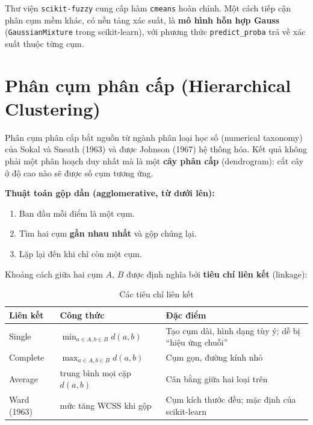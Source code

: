 Thư viện \texttt{scikit-fuzzy} cung cấp hàm \texttt{cmeans} hoàn chỉnh. Một cách tiếp cận phân cụm mềm khác, có nền tảng xác suất, là \textbf{mô hình hỗn hợp Gauss} (\texttt{GaussianMixture} trong scikit-learn), với phương thức \texttt{predict\_proba} trả về xác suất thuộc từng cụm.

\section{Phân cụm phân cấp (Hierarchical Clustering)}

Phân cụm phân cấp bắt nguồn từ ngành phân loại học số (numerical taxonomy) của Sokal và Sneath (1963) và được Johnson (1967) hệ thống hóa. Kết quả không phải một phân hoạch duy nhất mà là một \textbf{cây phân cấp} (dendrogram): cắt cây ở độ cao nào sẽ được số cụm tương ứng.

\noindent\textbf{Thuật toán gộp dần (agglomerative, từ dưới lên):}
\begin{enumerate}
    \item Ban đầu mỗi điểm là một cụm.
    \item Tìm hai cụm \textbf{gần nhau nhất} và gộp chúng lại.
    \item Lặp lại đến khi chỉ còn một cụm.
\end{enumerate}

Khoảng cách giữa hai cụm $A$, $B$ được định nghĩa bởi \textbf{tiêu chí liên kết} (linkage):
\begin{table}[H]
\centering
\begin{tabular}{|l|l|p{6cm}|}
\hline
\textbf{Liên kết} & \textbf{Công thức} & \textbf{Đặc điểm} \\
\hline
Single & $\min_{a \in A, b \in B} d(a, b)$ & Tạo cụm dài, hình dạng tùy ý; dễ bị ``hiệu ứng chuỗi'' \\ \hline
Complete & $\max_{a \in A, b \in B} d(a, b)$ & Cụm gọn, đường kính nhỏ \\ \hline
Average & trung bình mọi cặp $d(a, b)$ & Cân bằng giữa hai loại trên \\ \hline
Ward (1963) & mức tăng WCSS khi gộp & Cụm kích thước đều; mặc định của scikit-learn \\ \hline
\end{tabular}
\caption{Các tiêu chí liên kết}
\end{table}

